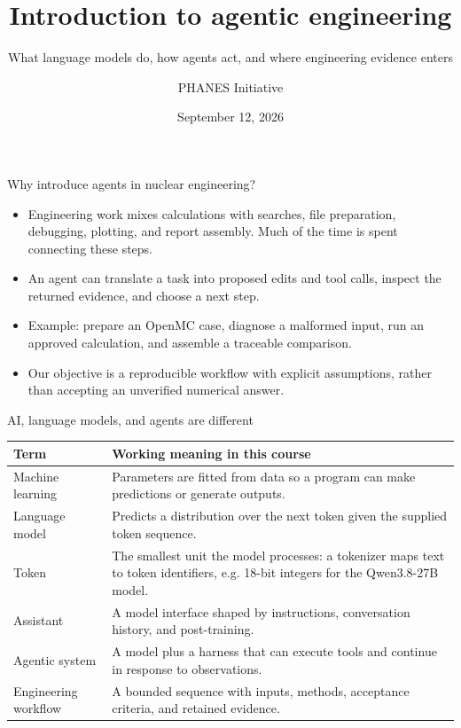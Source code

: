 \documentclass[aspectratio=169,11pt]{beamer}
\title{Introduction to agentic engineering}
\subtitle{What language models do, how agents act, and where engineering evidence enters}
\author{PHANES Initiative}
\institute{The University of Texas at Austin}
\date{September 12, 2026}
\begin{document}
\begin{frame}[plain]
\titlepage
\end{frame}
\begin{frame}[t,fragile]{Why introduce agents in nuclear engineering?}
\fontsize{11.5}{14}\selectfont
\begin{itemize}\setlength{\itemsep}{2mm}
\item Engineering work mixes calculations with searches, file preparation, debugging, plotting, and report assembly. Much of the time is spent connecting these steps.
\item An agent can translate a task into proposed edits and tool calls, inspect the returned evidence, and choose a next step.
\item Example: prepare an OpenMC case, diagnose a malformed input, run an approved calculation, and assemble a traceable comparison.
\item Our objective is a reproducible workflow with explicit assumptions, rather than accepting an unverified numerical answer.
\end{itemize}
\end{frame}
\begin{frame}[t,fragile]{AI, language models, and agents are different}
\fontsize{10.5}{12.5}\selectfont\setlength{\tabcolsep}{4pt}\renewcommand{\arraystretch}{1.15}
\begin{tabular}{>{\raggedright\arraybackslash}p{}>{\raggedright\arraybackslash}p{}}
\toprule
\textbf{Term} & \textbf{Working meaning in this course} \\ \midrule
Machine learning & Parameters are fitted from data so a program can make predictions or generate outputs. \\[2pt]
Language model & Predicts a distribution over the next token given the supplied token sequence. \\[2pt]
Token & The smallest unit the model processes: a tokenizer maps text to token identifiers, e.g. 18-bit integers for the Qwen3.8-27B model. \\[2pt]
Assistant & A model interface shaped by instructions, conversation history, and post-training. \\[2pt]
Agentic system & A model plus a harness that can execute tools and continue in response to observations. \\[2pt]
Engineering workflow & A bounded sequence with inputs, methods, acceptance criteria, and retained evidence. \\[2pt]
\bottomrule\end{tabular}\par\vspace{2mm}
\end{frame}
\end{document}
